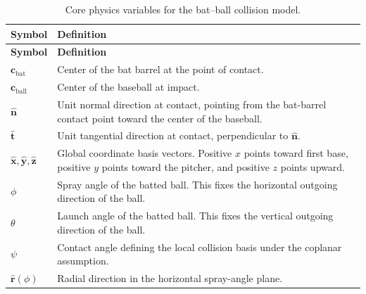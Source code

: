 \documentclass[11pt]{article}
\begin{document}
\begin{scriptsize}
\renewcommand{\arraystretch}{1.10}

\begin{longtable}{>{\raggedright\arraybackslash}p{}
                  >{\raggedright\arraybackslash}p{}}

\caption{Core physics variables for the bat--ball collision model.}
\label{tab:core_physics_variables} \\

\toprule
\textbf{Symbol} & \textbf{Definition} \\
\midrule
\endfirsthead

\toprule
\textbf{Symbol} & \textbf{Definition} \\
\midrule
\endhead

\bottomrule
\endlastfoot

\(\mathbf{c}_{\mathrm{bat}}\) 
& Center of the bat barrel at the point of contact. \\

\(\mathbf{c}_{\mathrm{ball}}\) 
& Center of the baseball at impact. \\

\(\hat{\mathbf{n}}\) 
& Unit normal direction at contact, pointing from the bat-barrel contact point toward the center of the baseball. \\

\(\hat{\mathbf{t}}\) 
& Unit tangential direction at contact, perpendicular to \(\hat{\mathbf{n}}\). \\

\(\hat{\mathbf{x}},\hat{\mathbf{y}},\hat{\mathbf{z}}\) 
& Global coordinate basis vectors. Positive \(x\) points toward first base, positive \(y\) points toward the pitcher, and positive \(z\) points upward. \\

\(\phi\) 
& Spray angle of the batted ball. This fixes the horizontal outgoing direction of the ball. \\

\(\theta\) 
& Launch angle of the batted ball. This fixes the vertical outgoing direction of the ball. \\

\(\psi\) 
& Contact angle defining the local collision basis under the coplanar assumption. \\

\(\hat{\mathbf{r}}(\phi)\) 
& Radial direction in the horizontal spray-angle plane. \\


\end{longtable}
\end{scriptsize}
\end{document}
